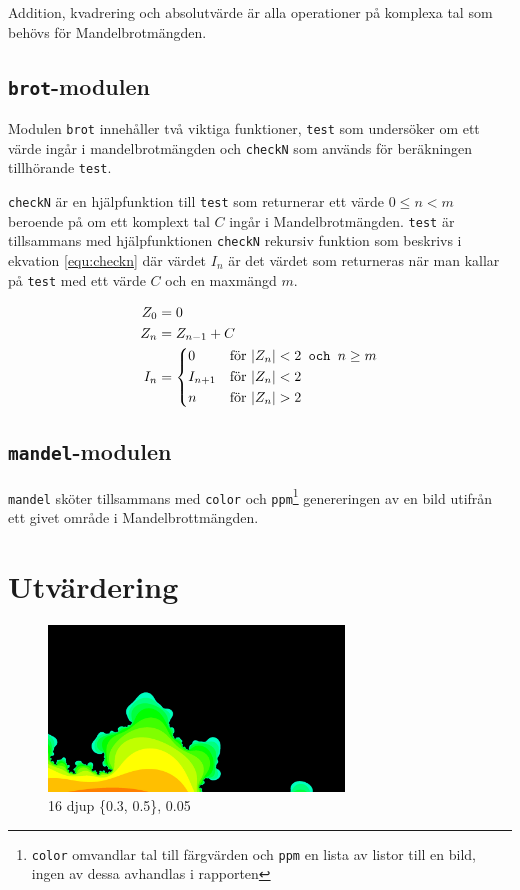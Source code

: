 \documentclass[a4paper, 11pt]{article}
\begin{document}
Addition, kvadrering och absolutvärde är alla operationer på komplexa tal som behövs för Mandelbrotmängden.

\subsection{\texttt{brot}-modulen}
Modulen \texttt{brot} innehåller två viktiga funktioner, \texttt{test} som undersöker om ett värde ingår i mandelbrotmängden och \texttt{checkN} som används för beräkningen tillhörande \texttt{test}.

\texttt{checkN} är en hjälpfunktion till \texttt{test} som returnerar ett värde $0 \leq n < m$ beroende på om ett komplext tal $C$ ingår i Mandelbrotmängden. \texttt{test} är tillsammans med hjälpfunktionen \texttt{checkN} rekursiv funktion som beskrivs i ekvation \ref{equ:checkn} där värdet $I_n$ är det värdet som returneras när man kallar på \texttt{test} med ett värde $C$ och en maxmängd $m$.

\begin{subequations}\label{equ:checkn}
\begin{align}
Z_{0} &= 0\\
Z_{n} &= Z_{n-1} + C\\
I_n &= \begin{dcases}
	0 & \text{för } |Z_n| < 2 \texttt{ och } n \geq m\\
	I_{n+1} & \text{för } |Z_n| < 2\\
	n & \text{för } |Z_n| > 2\\
\end{dcases}
\end{align}
\end{subequations}

\subsection{\texttt{mandel}-modulen}

\texttt{mandel} sköter tillsammans med \texttt{color} och \texttt{ppm}\footnote{\texttt{color} omvandlar tal till färgvärden och \texttt{ppm} en lista av listor till en bild, ingen av dessa avhandlas i rapporten} genereringen av en bild utifrån ett givet område i Mandelbrottmängden.

\section{Utvärdering}

\begin{figure}[h!]
  \centering
    \includegraphics[width=0.7\textwidth]{1080p16zoneb}
  \caption{16 djup \{0.3, 0.5\}, 0.05}
  \label{fig:B16d}
\end{figure}
\end{document}
